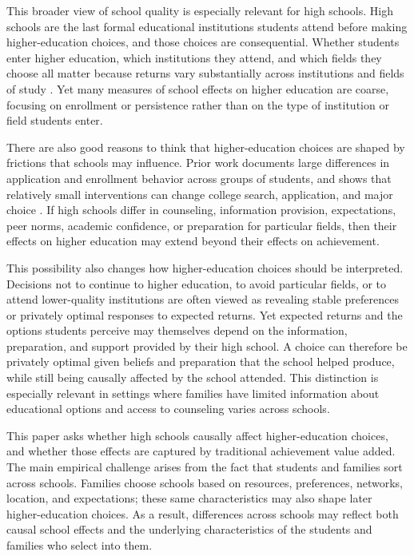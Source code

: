 \documentclass[a4paper, article, english, oneside, unknownkeysallowed, 12pt]{memoir}
\begin{document}
This broader view of school quality is especially relevant for high schools.
High schools are the last formal educational institutions students attend before making higher-education choices, and those choices are consequential.
Whether students enter higher education, which institutions they attend, and which fields they choose all matter because returns vary substantially across institutions and fields of study \parencite{kirkeboen_field_2016}.
Yet many measures of school effects on higher education are coarse, focusing on enrollment or persistence rather than on the type of institution or field students enter.

There are also good reasons to think that higher-education choices are shaped by frictions that schools may influence.
Prior work documents large differences in application and enrollment behavior across groups of students, and shows that relatively small interventions can change college search, application, and major choice \parencite{hoxby_what_2015, dynarski_closing_2021, hastings_informed_2016, chetty_diversifying_2025}.
If high schools differ in counseling, information provision, expectations, peer norms, academic confidence, or preparation for particular fields, then their effects on higher education may extend beyond their effects on achievement.

This possibility also changes how higher-education choices should be interpreted.
Decisions not to continue to higher education, to avoid particular fields, or to attend lower-quality institutions are often viewed as revealing stable preferences or privately optimal responses to expected returns.
Yet expected returns and the options students perceive may themselves depend on the information, preparation, and support provided by their high school.
A choice can therefore be privately optimal given beliefs and preparation that the school helped produce, while still being causally affected by the school attended.
This distinction is especially relevant in settings where families have limited information about educational options and access to counseling varies across schools.

This paper asks whether high schools causally affect higher-education choices, and whether those effects are captured by traditional achievement value added.
The main empirical challenge arises from the fact that students and families sort across schools.
Families choose schools based on resources, preferences, networks, location, and expectations; these same characteristics may also shape later higher-education choices.
As a result, differences across schools may reflect both causal school effects and the underlying characteristics of the students and families who select into them.
\end{document}
